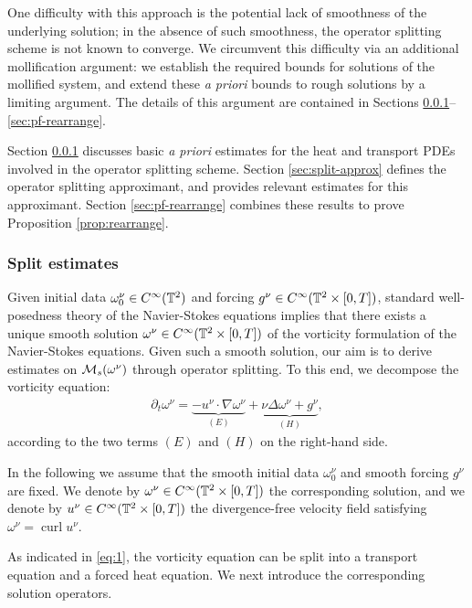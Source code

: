 \documentclass[reqno,12pt]{amsart}
\DeclareMathOperator{\curl}{curl}
\begin{document}
One  difficulty with this approach is the potential lack of smoothness of the underlying solution; in the absence of such smoothness, the operator splitting scheme is not known to converge. We circumvent this difficulty via an additional mollification argument: we establish the required bounds for solutions of the mollified system, and extend these {\it a priori} bounds to rough solutions by a limiting argument. The details of this argument are contained in Sections \ref{sec:operator}--\ref{sec:pf-rearrange}.

Section \ref{sec:operator} discusses basic {\it a priori} estimates for the heat and transport PDEs involved in the operator splitting scheme. Section \ref{sec:split-approx} defines the operator splitting approximant, and provides relevant estimates for this approximant. Section \ref{sec:pf-rearrange} combines these results to prove Proposition \ref{prop:rearrange}.

\subsubsection{Split estimates}
\label{sec:operator}

Given initial data $\omega_0^\nu \in C^\infty(\mathbb{T}^2)$ and forcing $g^\nu \in C^\infty(\mathbb{T}^2\times [0,T])$, standard well-posedness theory of the Navier-Stokes equations implies that there exists a unique smooth solution $\omega^\nu \in C^\infty(\mathbb{T}^2\times [0,T])$ of the vorticity formulation of the Navier-Stokes equations. Given such a smooth solution, our aim is to derive estimates on $\mathcal{M}_s(\omega^\nu)$ through operator splitting. To this end, we decompose the vorticity equation:
\begin{align}
\label{eq:1}
\partial_t \omega^\nu = \underbrace{-u^\nu \cdot \nabla \omega^\nu}_{(E)} + \underbrace{\nu \Delta \omega^\nu + g^\nu}_{(H)},
\end{align}
according to the two terms $(E)$ and $(H)$ on the right-hand side.
\bigskip

In the following we assume that the smooth initial data $\omega_0^\nu$ and smooth forcing $g^\nu$ are fixed. We denote by $\omega^\nu \in C^\infty(\mathbb{T}^2\times [0,T])$ the corresponding solution, and we denote by $u^\nu \in C^\infty(\mathbb{T}^2\times[0,T])$ the divergence-free velocity field satisfying $\omega^\nu = \curl u^\nu$.

\bigskip

As indicated in \eqref{eq:1}, the vorticity equation can be split into a transport equation and a forced heat equation. We next introduce the corresponding solution operators.
\bigskip
\end{document}
